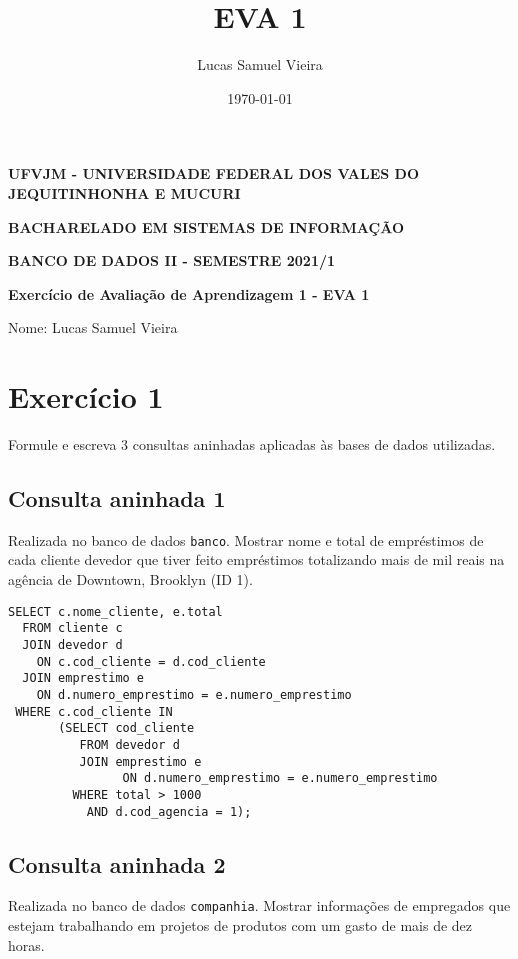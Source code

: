 \documentclass[article, a4paper, oneside, 11pt, english, brazil, sumario=tradicional]{abntex2}
\author{Lucas Samuel Vieira}
\date{\today}
\title{EVA 1}
\begin{document}
\OnehalfSpacing
\pretextual
\textual

\begin{center}
\textbf{UFVJM - UNIVERSIDADE FEDERAL DOS VALES DO JEQUITINHONHA E MUCURI}

\textbf{BACHARELADO EM SISTEMAS DE INFORMAÇÃO}

\textbf{BANCO DE DADOS II - SEMESTRE 2021/1}

\textbf{Exercício de Avaliação de Aprendizagem 1 - EVA 1}
\end{center}

\noindent
Nome: Lucas Samuel Vieira
\newline

\section{Exercício 1}
\label{sec:orga624afd}

Formule e escreva 3 consultas aninhadas aplicadas às bases de dados utilizadas.

\subsection{Consulta aninhada 1}
\label{sec:org25e0b91}

Realizada no banco de dados \texttt{banco}.
Mostrar nome  e total  de empréstimos  de cada cliente  devedor que  tiver feito
empréstimos totalizando mais  de mil reais na agência de  Downtown, Brooklyn (ID
1).

\begin{verbatim}
SELECT c.nome_cliente, e.total
  FROM cliente c
  JOIN devedor d
    ON c.cod_cliente = d.cod_cliente
  JOIN emprestimo e
    ON d.numero_emprestimo = e.numero_emprestimo
 WHERE c.cod_cliente IN
       (SELECT cod_cliente
          FROM devedor d
          JOIN emprestimo e
                ON d.numero_emprestimo = e.numero_emprestimo
         WHERE total > 1000
           AND d.cod_agencia = 1);
\end{verbatim}

\subsection{Consulta aninhada 2}
\label{sec:org924dee8}

Realizada no banco de dados \texttt{companhia}.
Mostrar  informações  de  empregados  que estejam  trabalhando  em  projetos  de
produtos com um gasto de mais de dez horas.
\end{document}
